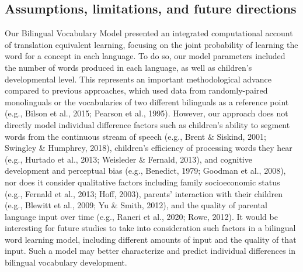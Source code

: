 \documentclass[
  english,
  ,man,floatsintext]{apa6}
\begin{document}
\hypertarget{assumptions-limitations-and-future-directions}{%
\subsection{Assumptions, limitations, and future directions}\label{assumptions-limitations-and-future-directions}}

Our Bilingual Vocabulary Model presented an integrated computational account of translation equivalent learning, focusing on the joint probability of learning the word for a concept in each language. To do so, our model parameters included the number of words produced in each language, as well as children's developmental level. This represents an important methodological advance compared to previous approaches, which used data from randomly-paired monolinguals or the vocabularies of two different bilinguals as a reference point (e.g., Bilson et al., 2015; Pearson et al., 1995). However, our approach does not directly model individual difference factors such as children's ability to segment words from the continuous stream of speech (e.g., Brent \& Siskind, 2001; Swingley \& Humphrey, 2018), children's efficiency of processing words they hear (e.g., Hurtado et al., 2013; Weisleder \& Fernald, 2013), and cognitive development and perceptual bias (e.g., Benedict, 1979; Goodman et al., 2008), nor does it consider qualitative factors including family socioeconomic status (e.g., Fernald et al., 2013; Hoff, 2003), parents' interaction with their children (e.g., Blewitt et al., 2009; Yu \& Smith, 2012), and the quality of parental language input over time (e.g., Raneri et al., 2020; Rowe, 2012). It would be interesting for future studies to take into consideration such factors in a bilingual word learning model, including different amounts of input and the quality of that input. Such a model may better characterize and predict individual differences in bilingual vocabulary development.
\end{document}
